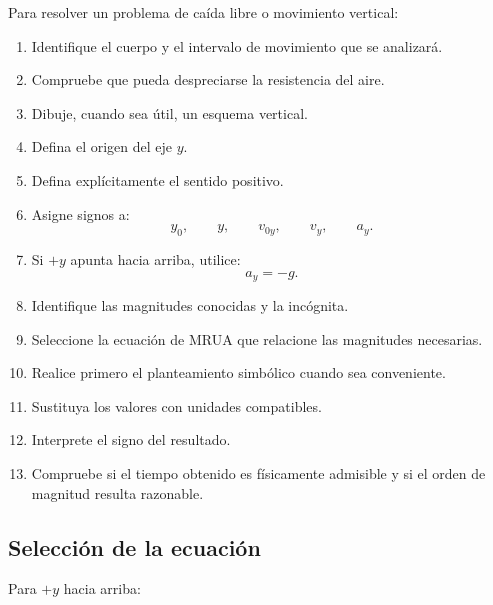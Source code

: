 \begin{estrategia}
Para resolver un problema de caída libre o movimiento vertical:

\begin{enumerate}
    \item Identifique el cuerpo y el intervalo de movimiento que se analizará.

    \item Compruebe que pueda despreciarse la resistencia del aire.

    \item Dibuje, cuando sea útil, un esquema vertical.

    \item Defina el origen del eje \(y\).

    \item Defina explícitamente el sentido positivo.

    \item Asigne signos a:
    \[
    y_0,\qquad y,\qquad v_{0y},\qquad v_y,\qquad a_y.
    \]

    \item Si \(+y\) apunta hacia arriba, utilice:
    \[
    a_y=-g.
    \]

    \item Identifique las magnitudes conocidas y la incógnita.

    \item Seleccione la ecuación de MRUA que relacione las magnitudes necesarias.

    \item Realice primero el planteamiento simbólico cuando sea conveniente.

    \item Sustituya los valores con unidades compatibles.

    \item Interprete el signo del resultado.

    \item Compruebe si el tiempo obtenido es físicamente admisible y si el orden de magnitud resulta razonable.
\end{enumerate}
\end{estrategia}


\subsection{Selección de la ecuación}

Para \(+y\) hacia arriba:


